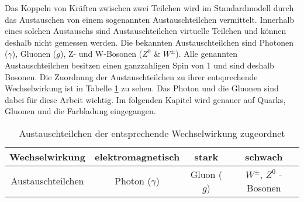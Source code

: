 Das Koppeln von Kr\"aften zwischen zwei Teilchen wird im Standardmodell durch das Austauschen von einem sogenannten Austauschteilchen vermittelt. Innerhalb eines solchen Austauschs sind Austauschteilchen virtuelle Teilchen und k\"onnen deshalb nicht gemessen werden. Die bekannten Austauschteilchen sind Photonen ($\gamma$), Gluonen ($g$), Z- und W-Bosonen ($Z^{0}$ \& $W^{\pm}$). Alle genannten Austauschteilchen besitzen einen ganzzahligen Spin von 1 und sind deshalb Bosonen. Die Zuordnung der Austauschteilchen zu ihrer entsprechende Wechselwirkung ist in Tabelle \ref{tab:Austeilchen} zu sehen. Das Photon und die Gluonen sind dabei f\"ur diese Arbeit wichtig. Im folgenden Kapitel wird genauer auf Quarks, Gluonen und die Farbladung eingegangen.

\begin{table}[h]
\centering
\begin{tabular}{|c||c|c|c|}
\hline
Wechselwirkung    & elektromagnetisch & stark       & schwach                      \\ \hline
Austauschteilchen & Photon ($\gamma$) & Gluon ($g$) & $W^{\pm}$, $Z^{0}$ - Bosonen \\ \hline
\end{tabular}
\caption{Austauschteilchen der entsprechende Wechselwirkung zugeordnet}
\label{tab:Austeilchen}
\end{table}
